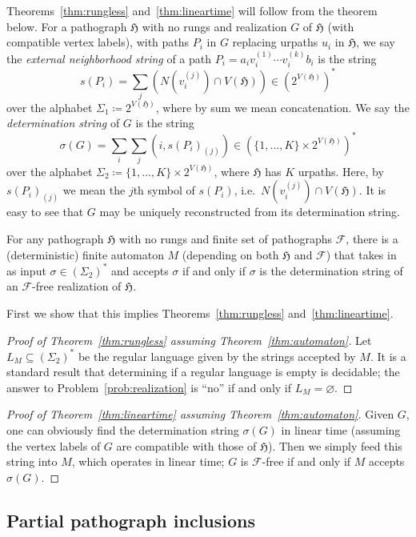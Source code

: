 \documentclass{article}
\newcommand{\Fc}{\mathcal{F}}
\newcommand{\Hf}{\mathfrak{H}}
\begin{document}
Theorems~\ref{thm:rungless} and~\ref{thm:lineartime} will follow from the theorem below. For a pathograph $\Hf$ with no rungs and realization $G$ of $\Hf$ (with compatible vertex labels), with paths $P_i$ in $G$ replacing urpaths $u_i$ in $\Hf$, we say the \textit{external neighborhood string} of a path $P_i=a_iv_i^{(1)}\cdots v_i^{(k)}b_i$ is the string 
\[ s(P_i) = \sum_j \left(N(v_i^{(j)})\cap V(\Hf)\right) \in (2^{V(\Hf)})^* \]
over the alphabet $\Sigma_1\coloneqq 2^{V(\Hf)}$, where by sum we mean concatenation. We say the \textit{determination string} of $G$ is the string
\[ \sigma(G) = \sum_i \sum_j (i, s(P_i)_{(j)}) \in (\{1,\dots,K\}\times 2^{V(\Hf)})^* \]
over the alphabet $\Sigma_2\coloneqq \{1,\dots,K\}\times 2^{V(\Hf)}$, where $\Hf$ has $K$ urpaths. Here, by $s(P_i)_{(j)}$ we mean the $j$th symbol of $s(P_i)$, i.e.\ $N(v_i^{(j)})\cap V(\Hf)$. It is easy to see that $G$ may be uniquely reconstructed from its determination string.
\begin{theorem}\label{thm:automaton}
For any pathograph $\Hf$ with no rungs and finite set of pathographs $\Fc$, there is a (deterministic) finite automaton $M$ (depending on both $\Hf$ and $\Fc$) that takes in as input $\sigma\in (\Sigma_2)^*$ and accepts $\sigma$ if and only if $\sigma$ is the determination string of an $\Fc$-free realization of $\Hf$.
\end{theorem}

First we show that this implies Theorems~\ref{thm:rungless} and~\ref{thm:lineartime}.

\begin{proof}[Proof of Theorem~\ref{thm:rungless} assuming Theorem~\ref{thm:automaton}]
Let $L_M\subseteq (\Sigma_2)^*$ be the regular language given by the strings accepted by $M$. It is a standard result that determining if a regular language is empty is decidable; the answer to Problem~\ref{prob:realization} is ``no'' if and only if $L_M=\varnothing$.
\end{proof}

\begin{proof}[Proof of Theorem~\ref{thm:lineartime} assuming Theorem~\ref{thm:automaton}]
Given $G$, one can obviously find the determination string $\sigma(G)$ in linear time (assuming the vertex labels of $G$ are compatible with those of $\Hf$). Then we simply feed this string into $M$, which operates in linear time; $G$ is $\Fc$-free if and only if $M$ accepts $\sigma(G)$.
\end{proof}

\subsection{Partial pathograph inclusions}
\end{document}
